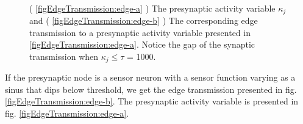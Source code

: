 \begin{figure}[hb!tp]
	\centering
   	  \\
	\caption{ 	( \ref{figEdgeTransmission:edge-a} ) The presynaptic activity variable $\kappa_j$         and   
				( \ref{figEdgeTransmission:edge-b} ) The corresponding edge transmission to a presynaptic activity variable presented in \ref{figEdgeTransmission:edge-a}. 
			Notice the gap of the synaptic transmission when $\kappa_j \leq \tau$ = 1000. 
			} %
	\label{figEdgeTransmission}
\end{figure}
			If the presynaptic node is a sensor neuron with a sensor function varying as a sinus that dips below threshold, we get the edge transmission presented in fig. \ref{figEdgeTransmission:edge-b}. 
			The presynaptic activity variable is presented in fig. \ref{figEdgeTransmission:edge-a}.

